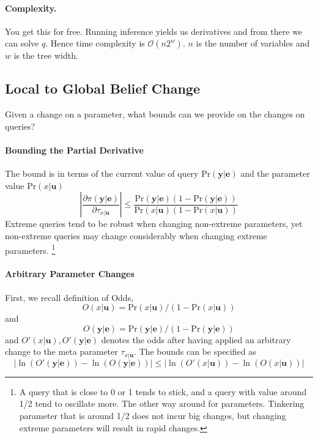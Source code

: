 \documentclass[11pt]{article}
\newcommand{\be}{\mathbf{e}}
\newcommand{\bu}{\mathbf{u}}
\newcommand{\by}{\mathbf{y}}
\newcommand{\pr}{\mathrm{Pr}}
\begin{document}
\paragraph{Complexity.} You get this for free. Running inference yields us derivatives and from there we can solve $q$. Hence time complexity is $\mathcal O (n 2^w)$. $n$ is the number of variables and $w$ is the tree width. 

\subsection{Local to Global Belief Change}
Given a change on a parameter, what bounds can we provide on the changes on queries? 

\paragraph{Bounding the Partial Derivative} The bound is in terms of the current value of query $ \pr(\by | \be)$ and the parameter value $ \pr(x| \bu)$
\begin{equation}
	\left| \frac{\partial \pi(\by | \be)}{\partial \tau_{x |\bu}} \right| \leq 
	\frac{\pr(\by | \be) (1 - \pr(\by | \be))}{\pr(x | \bu) (1 - \pr(x | \bu))}
\end{equation}
Extreme queries tend to be robust when changing non-extreme parameters, yet non-extreme queries may change considerably when changing extreme parameters. \footnote{A query that is close to 0 or 1 tends to stick, and a query with value around 1/2 tend to oscillate more. The other way around for parameters. Tinkering parameter that is around 1/2 does not incur big changes, but changing extreme parameters will result in rapid changes.}

\paragraph{Arbitrary Parameter Changes}
First, we recall definition of Odds, 
\begin{equation}
	O(x | \bu) = \pr(x |\bu) / (1 - \pr( x | \bu))
\end{equation}
and \begin{equation}
	O(\by | \be) = \pr( \by | \be) / (1 - \pr( \by | \be))
\end{equation}
and $O'(x | \bu), O'(\by| \be)$ denotes the odds after having applied an arbitrary change to the meta parameter $\tau_{x |\bu}$. The bounds can be specified as 
\begin{equation}
	\left| \ln (O'(\by | \be)) - \ln (O (\by |\be) )\right| \leq \left|\ln (O'( x |\bu)) - \ln ( O(x | \bu))\right| 
\end{equation}
\end{document}
